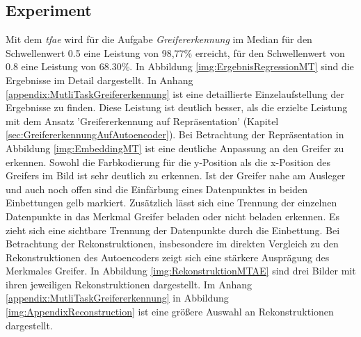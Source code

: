 	\subsection{Experiment}
	Mit dem \textit{\ac{tfae}} wird für die Aufgabe \textit{Greifererkennung} im Median für den Schwellenwert 0.5 eine Leistung von 98,77\% erreicht, für den Schwellenwert von 0.8 eine Leistung von 68.30\%. In Abbildung \ref{img:ErgebnisRegressionMT} sind die Ergebnisse im Detail dargestellt. In Anhang \ref{appendix:MutliTaskGreifererkennung} ist eine detaillierte Einzelaufstellung der Ergebnisse zu finden. Diese Leistung ist deutlich besser, als die erzielte Leistung mit dem Ansatz 'Greifererkennung auf Repräsentation' (Kapitel \ref{sec:GreifererkennungAufAutoencoder}). Bei Betrachtung der Repräsentation in Abbildung \ref{img:EmbeddingMT} ist eine deutliche Anpassung an den Greifer zu erkennen. Sowohl die Farbkodierung für die y-Position als die x-Position des Greifers im Bild ist sehr deutlich zu erkennen. Ist der Greifer nahe am Ausleger und auch noch offen sind die Einfärbung eines Datenpunktes in beiden Einbettungen gelb markiert. Zusätzlich lässt sich eine Trennung der einzelnen Datenpunkte in das Merkmal Greifer beladen oder nicht beladen erkennen. Es zieht sich eine sichtbare Trennung der Datenpunkte durch die Einbettung. Bei Betrachtung der Rekonstruktionen, insbesondere im direkten Vergleich zu den Rekonstruktionen des Autoencoders zeigt sich eine stärkere Ausprägung des Merkmales Greifer. In Abbildung \ref{img:RekonstruktionMTAE} sind drei Bilder mit ihren jeweiligen Rekonstruktionen dargestellt. Im Anhang \ref{appendix:MutliTaskGreifererkennung} in Abbildung \ref{img:AppendixReconstruction} ist eine größere Auswahl an Rekonstruktionen dargestellt.  
